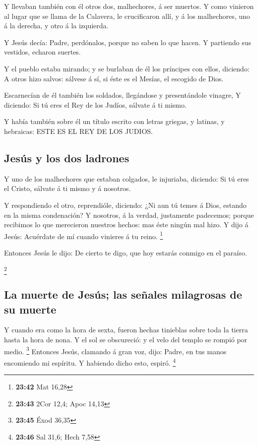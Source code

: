  Y llevaban también con él otros dos, malhechores, á ser
muertos.  Y como vinieron al lugar que se llama de la
Calavera, le crucificaron allí, y á los malhechores, uno á la derecha, y
otro á la izquierda.

 Y Jesús decía: Padre, perdónalos, porque no saben lo que
hacen. Y partiendo sus vestidos, echaron suertes.

 Y el pueblo estaba mirando; y se burlaban de él los
príncipes con ellos, diciendo: A otros hizo salvos: sálvese á sí, si
éste es el Mesías, el escogido de Dios.

 Escarnecían de él también los soldados, llegándose y
presentándole vinagre,  Y diciendo: Si tú eres el Rey de
los Judíos, sálvate á ti mismo.

 Y había también sobre él un título escrito con letras
griegas, y latinas, y hebraicas: ESTE ES EL REY DE LOS JUDIOS.

\hypertarget{jesuxfas-y-los-dos-ladrones}{%
\subsection{Jesús y los dos
ladrones}\label{jesuxfas-y-los-dos-ladrones}}

 Y uno de los malhechores que estaban colgados, le
injuriaba, diciendo: Si tú eres el Cristo, sálvate á ti mismo y á
nosotros.

 Y respondiendo el otro, reprendióle, diciendo: ¿Ni aun tú
temes á Dios, estando en la misma condenación?  Y nosotros,
á la verdad, justamente padecemos; porque recibimos lo que merecieron
nuestros hechos: mas éste ningún mal hizo.  Y dijo á Jesús:
Acuérdate de mí cuando vinieres á tu reino. \footnote{\textbf{23:42} Mat
  16,28}

 Entonces Jesús le dijo: De cierto te digo, que hoy estarás
conmigo en el paraíso.

\footnote{\textbf{23:43} 2Cor 12,4; Apoc 14,13}

\hypertarget{la-muerte-de-jesuxfas-las-seuxf1ales-milagrosas-de-su-muerte}{%
\subsection{La muerte de Jesús; las señales milagrosas de su
muerte}\label{la-muerte-de-jesuxfas-las-seuxf1ales-milagrosas-de-su-muerte}}

 Y cuando era como la hora de sexta, fueron hechas
tinieblas sobre toda la tierra hasta la hora de nona.  Y el
sol se obscureció: y el velo del templo se rompió por medio. \footnote{\textbf{23:45}
  Éxod 36,35}  Entonces Jesús, clamando á gran voz, dijo:
Padre, en tus manos encomiendo mi espíritu. Y habiendo dicho esto,
espiró. \footnote{\textbf{23:46} Sal 31,6; Hech 7,58}

